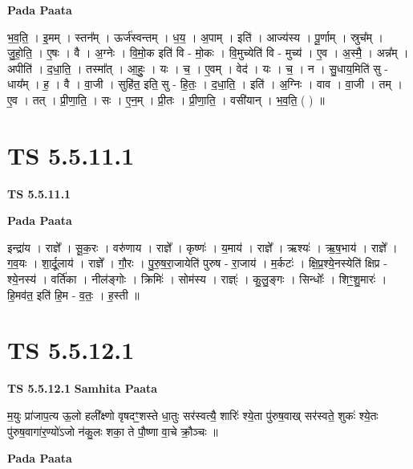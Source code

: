 \documentclass[17pt]{extarticle}
\begin{document}
\textbf{Pada Paata} \newline

भ॒व॒ति॒ । इ॒मम् । स्तन᳚म् । ऊर्ज॑स्वन्तम् । ध॒य॒ । अ॒पाम् । इति॑ । आज्य॑स्य । पू॒र्णाम् । स्रुच᳚म् । जु॒हो॒ति॒ । ए॒षः । वै । अ॒ग्नेः । वि॒मो॒क इति॑ वि - मो॒कः । वि॒मुच्येति॑ वि - मुच्य॑ । ए॒व । अ॒स्मै॒ । अन्न᳚म् । अपीति॑ । द॒धा॒ति॒ । तस्मा᳚त् । आ॒हुः॒ । यः । च॒ । ए॒वम् । वेद॑ । यः । च॒ । न । सु॒धाय॒मिति॑ सु - धाय᳚म् । ह॒ । वै । वा॒जी । सुहि॑त॒ इति॒ सु - हि॒तः॒ । द॒धा॒ति॒ । इति॑ । अ॒ग्निः । वाव । वा॒जी । तम् । ए॒व । तत् । प्री॒णा॒ति॒ । सः । ए॒न॒म् । प्री॒तः । प्री॒णा॒ति॒ । वसी॑यान् । भ॒व॒ति॒ ( ) ॥  \newline





\section{ TS 5.5.11.1 }

\textbf{TS 5.5.11.1 } \newline

\textbf{Pada Paata} \newline

इन्द्रा॑य । राज्ञे᳚ । सू॒क॒रः । वरु॑णाय । राज्ञे᳚ । कृष्णः॑ । य॒माय॑ । राज्ञे᳚ । ऋश्यः॑ । ऋ॒ष॒भाय॑ । राज्ञे᳚ । ग॒व॒यः । शा॒र्दू॒लाय॑ । राज्ञे᳚ । गौ॒रः । पु॒रु॒ष॒रा॒जायेति॑ पुरुष - रा॒जाय॑ । म॒र्कटः॑ । क्षि॒प्र॒श्ये॒नस्येति॑ क्षिप्र - श्ये॒नस्य॑ । वर्ति॑का । नील॑ङ्गोः । क्रिमिः॑ । सोम॑स्य । राज्ञ्ः॑ । कु॒लु॒ङ्गः । सिन्धोः᳚ । शिꣳ॒॒शु॒मारः॑ । हि॒मव॑त॒ इति॑ हि॒म - व॒तः॒ । ह॒स्ती ॥  \newline





\section{ TS 5.5.12.1 }

\textbf{TS 5.5.12.1 } \newline
\textbf{Samhita Paata} \newline

म॒युः प्रा॑जाप॒त्य ऊ॒लो हली᳚क्ष्णो वृषदꣳ॒॒शस्ते धा॒तुः सर॑स्वत्यै॒ शारिः॑ श्ये॒ता पु॑रुष॒वाख् सर॑स्वते॒ शुकः॑ श्ये॒तः पु॑रुष॒वागा॑र॒ण्यो॑ऽजो न॑कु॒लः शका॒ ते पौ॒ष्णा वा॒चे क्रौ॒ञ्चः ॥ \newline

\textbf{Pada Paata} \newline
\end{document}
